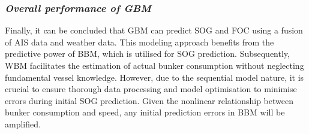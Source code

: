 \subsubsection*{\emph{Overall performance of GBM}}

Finally, it can be concluded that GBM can predict SOG and FOC using a fusion of AIS data and weather data. This modeling approach benefits from the predictive power of BBM, which is utilised for SOG prediction. Subsequently, WBM facilitates the estimation of actual bunker consumption without neglecting fundamental vessel knowledge.  However, due to the sequential model nature, it is crucial to ensure thorough data processing and model optimisation to minimise errors during initial SOG prediction. Given the nonlinear relationship between bunker consumption and speed, any initial prediction errors in BBM will be amplified.\\













